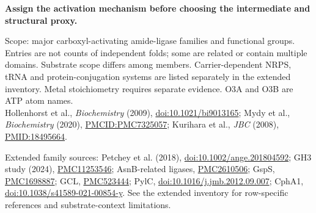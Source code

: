 \documentclass{article}
\begin{document}
\par\vspace{17pt}
{\fontsize{18}{22}\selectfont\bfseries\color{blue}
Assign the activation mechanism before choosing the intermediate and structural proxy.}\par
\vspace{10pt}
{\fontsize{11}{14}\selectfont
Scope: major carboxyl-activating amide-ligase families and functional groups. Entries are not counts of independent folds;
some are related or contain multiple domains. Substrate scope differs among members. Carrier-dependent NRPS, tRNA and
protein-conjugation systems are listed separately in the extended inventory. Metal stoichiometry requires separate evidence.
O3A and O3B are ATP atom names.\\[4pt]
Hollenhorst et al., \textit{Biochemistry} (2009), \href{https://doi.org/10.1021/bi9013165}{doi:10.1021/bi9013165};
Mydy et al., \textit{Biochemistry} (2020), \href{https://pmc.ncbi.nlm.nih.gov/articles/PMC7325057/}{PMCID:PMC7325057};
Kurihara et al., \textit{JBC} (2008), \href{https://pubmed.ncbi.nlm.nih.gov/18495664/}{PMID:18495664}.}
\par\vspace{5pt}
{\fontsize{10}{13}\selectfont
Extended family sources: Petchey et al. (2018), \href{https://doi.org/10.1002/ange.201804592}{doi:10.1002/ange.201804592};
GH3 study (2024), \href{https://pmc.ncbi.nlm.nih.gov/articles/PMC11253546/}{PMC11253546};
AsnB-related ligases, \href{https://pmc.ncbi.nlm.nih.gov/articles/PMC2610506/}{PMC2610506};
GspS, \href{https://pmc.ncbi.nlm.nih.gov/articles/PMC1698887/}{PMC1698887};
GCL, \href{https://pmc.ncbi.nlm.nih.gov/articles/PMC523444/}{PMC523444};
PylC, \href{https://doi.org/10.1016/j.jmb.2012.09.007}{doi:10.1016/j.jmb.2012.09.007};
CphA1, \href{https://doi.org/10.1038/s41589-021-00854-y}{doi:10.1038/s41589-021-00854-y}.
See the extended inventory for row-specific references and substrate-context limitations.}
\end{document}
